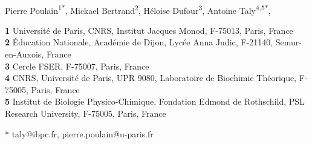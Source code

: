 \documentclass[10pt,letterpaper]{article}
\begin{document}
\vspace*{0.2in}

\begin{flushleft}
{\Large
\textbf{} 
}
\newline
\\
Pierre Poulain\textsuperscript{1*},
Mickael Bertrand\textsuperscript{2},
Héloise Dufour\textsuperscript{3},
Antoine Taly\textsuperscript{4,5*},

\bigskip
\textbf{1} Université de Paris, CNRS, Institut Jacques Monod, F-75013, Paris, France
\\
\textbf{2} Éducation Nationale, Académie de Dijon, Lycée Anna Judic, F-21140, Semur-en-Auxois, France
\\
\textbf{3} Cercle FSER, F-75007, Paris, France
\\
\textbf{4} CNRS, Université de Paris, UPR 9080, Laboratoire de Biochimie Théorique, F-75005, Paris, France
\\
\textbf{5} Institut de Biologie Physico-Chimique, Fondation Edmond de Rothschild, PSL Research University, F-75005, Paris, France
\\
\bigskip

% 
%





* taly@ibpc.fr, pierre.poulain@u-paris.fr

\end{flushleft}
\end{document}
